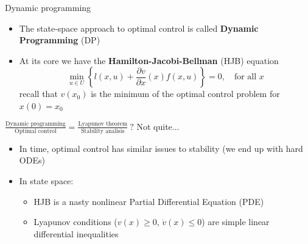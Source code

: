 \documentclass[aspectratio=169]{beamer}
\begin{document}
\begin{frame}{Dynamic programming}
\begin{itemize}
\item
The state-space approach to optimal control is called \textbf{Dynamic Programming} (DP)
\item
At its core we have the \textbf{Hamilton-Jacobi-Bellman} (HJB) equation
$$
\min_{u \in U} \left\{ l(x, u) + \frac{\partial v}{\partial x} (x) f(x, u) \right\} = 0, \quad \text{for all } x
$$
recall that $v(x_0)$ is the minimum of the optimal control problem for $x(0) = x_0$
\end{itemize}
\pause
\begin{block}{$\frac{\text{Dynamic programming}}{\text{Optimal control}} = \frac{\text{Lyapunov theorem}}{\text{Stability analisis}}\ ?$ Not quite...}
\begin{itemize}
\item
In time, optimal control has similar issues to stability (we end up with hard ODEs)
\item
In state space:
\begin{itemize}
\item
HJB is a nasty nonlinear Partial Differential Equation (PDE)
\item
Lyapunov conditions ($v(x) \geq 0$, $\dot v(x) \leq 0$) are simple linear differential inequalities
\end{itemize}
\end{itemize}
\end{block}
\end{frame}
\end{document}

